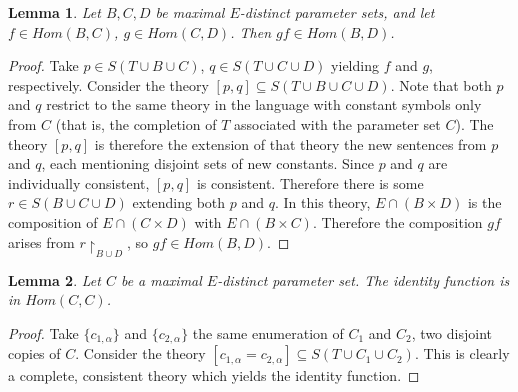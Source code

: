 \documentclass[letterpaper,twoside]{article}
\newtheorem{lemma}{Lemma}[theorem]
\theoremstyle{definition}
\theoremstyle{remark}
\begin{document}
\begin{lemma}\label{lemma-galoiscomposition}
  Let \(B,C,D\) be maximal \(E\)-distinct parameter sets, and let \(f
  \in Hom(B,C)\), \(g \in Hom(C,D)\).  Then \(gf \in Hom(B,D)\).
\end{lemma}
\begin{proof}
  Take \(p \in S(T \cup B \cup C)\), \(q \in S(T \cup C \cup D)\)
  yielding \(f\) and \(g\), respectively.  Consider the theory \([p,
    q] \subseteq S(T \cup B \cup C \cup D)\).  Note that both \(p\)
  and \(q\) restrict to the same theory in the language with constant
  symbols only from \(C\) (that is, the completion of \(T\) associated
  with the parameter set \(C\)).  The theory \([p,q]\) is therefore
  the extension of that theory the new sentences from \(p\) and \(q\),
  each mentioning disjoint sets of new constants.  Since \(p\) and
  \(q\) are individually consistent, \([p,q]\) is consistent.
  Therefore there is some \(r \in S(B \cup C \cup D)\) extending both
  \(p\) and \(q\).  In this theory, \(E \cap (B \times D)\) is the
  composition of \(E \cap (C \times D)\) with \(E \cap (B \times C)\).
  Therefore the composition \(gf\) arises from \(r \restriction_{B
    \cup D}\), so \(gf \in Hom(B,D)\).
\end{proof}

\begin{lemma}\label{lemma-galoisidentity}
  Let \(C\) be a maximal \(E\)-distinct parameter set.  The identity
  function is in \(Hom(C,C)\).
\end{lemma}
\begin{proof}
  Take \(\{c_{1,\alpha}\}\) and \(\{c_{2,\alpha}\}\) the same
  enumeration of \(C_1\) and \(C_2\), two disjoint copies of \(C\).
  Consider the theory \([c_{1,\alpha} = c_{2,\alpha}] \subseteq S(T
  \cup C_1 \cup C_2)\).  This is clearly a complete, consistent theory
  which yields the identity function.
\end{proof}
\end{document}
